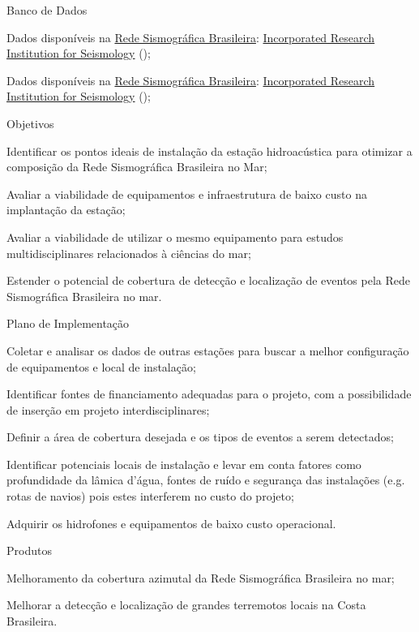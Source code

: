 \documentclass[10pt,a4paper,oneside]{book}
\begin{document}
\begin{fancyenum}{\faDatabase}{Banco de Dados}
	\item Dados disponíveis na \href{http://rsbr.on.br/}{Rede Sismográfica Brasileira}: \href{https://ds.iris.edu/gmap/\#network=IM\&planet=earth}{Incorporated Research Institution for Seismology} (\faUnlock);
	\item Dados disponíveis na \href{http://rsbr.on.br/}{Rede Sismográfica Brasileira}: \href{https://ds.iris.edu/gmap/\#network=IM\&planet=earth}{Incorporated Research Institution for Seismology} (\faUnlock);
\end{fancyenum}

\begin{fancyenum}{\faFutbol}{Objetivos}
	\item Identificar os pontos ideais de instalação da estação hidroacústica para otimizar a composição da Rede Sismográfica Brasileira no Mar;
	\item Avaliar a viabilidade de equipamentos e infraestrutura de baixo custo na implantação da estação;
	\item Avaliar a viabilidade de utilizar o mesmo equipamento para estudos multidisciplinares relacionados à ciências do mar;
	\item Estender o potencial de cobertura de detecção e localização de eventos pela Rede Sismográfica Brasileira no mar.
\end{fancyenum}

\begin{fancyenum}{\faBrain}{Plano de Implementação}
	\item Coletar e analisar os dados de outras estações para buscar a melhor configuração de equipamentos e local de instalação;
	\item Identificar fontes de financiamento adequadas para o projeto, com a possibilidade de inserção em projeto interdisciplinares;
	\item Definir a área de cobertura desejada e os tipos de eventos a serem detectados;
	\item Identificar potenciais locais de instalação e levar em conta fatores como profundidade da lâmica d'água, fontes de ruído e segurança das instalações (e.g. rotas de navios) pois estes interferem no custo do projeto;
	\item Adquirir os hidrofones e equipamentos de baixo custo operacional.
\end{fancyenum}

\begin{fancyenum}{\faShoppingCart}{Produtos}
	\item Melhoramento da cobertura azimutal da Rede Sismográfica Brasileira no mar;
	\item Melhorar a detecção e localização de grandes terremotos locais na Costa Brasileira.
\end{fancyenum}
\end{document}
